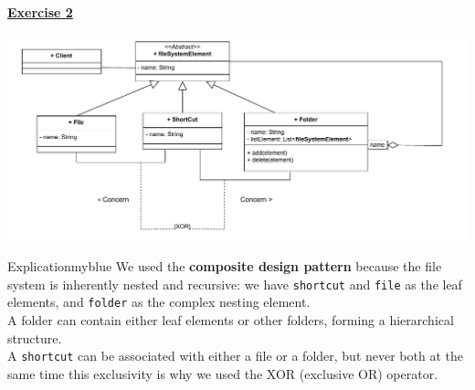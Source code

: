 \vspace{1cm}
\begin{center}
    \Huge{\textbf{\underline{Exercise 2}}}
\end{center}

\vspace{0.45cm}

\begin{center}
    \includegraphics[height=0.22\textheight]{Exercices/EX2/ex2.drawio.pdf}
\end{center}

\vspace{0.25cm}
\begin{prettyBox}{Explication}{myblue}
We used the \textbf{composite design pattern} because the file system is inherently nested and recursive: 
we have \texttt{shortcut} and \texttt{file} as the leaf elements, and \texttt{folder} as the complex nesting element.\\[0.15cm]
A folder can contain either leaf elements or other folders, forming a hierarchical structure.\\[0.15cm] 
A \texttt{shortcut} can be associated with either a file or a folder, but never both at the same time 
this exclusivity is why we used the XOR (exclusive OR) operator.
\end{prettyBox}

